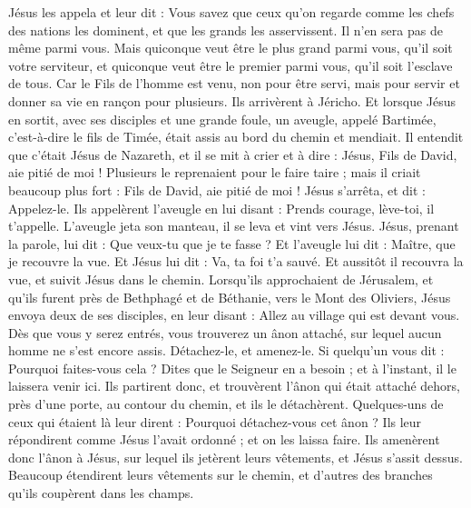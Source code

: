 \begin{multicols}{2}
Jésus les appela et leur dit : Vous savez que ceux qu’on regarde comme les chefs des nations les dominent, et que les grands les asservissent.
Il n'en sera pas de même parmi vous. Mais quiconque veut être le plus grand parmi vous, qu’il soit votre serviteur,
et quiconque veut être le premier parmi vous, qu’il soit l’esclave de tous.
Car le Fils de l'homme est venu, non pour être servi, mais pour servir et donner sa vie en rançon pour plusieurs.
Ils arrivèrent à Jéricho. Et lorsque Jésus en sortit, avec ses disciples et une grande foule, un aveugle, appelé Bartimée, c'est-à-dire le fils de Timée, était assis au bord du chemin et mendiait.
Il entendit que c'était Jésus de Nazareth, et il se mit à crier et à dire : Jésus, Fils de David, aie pitié de moi !
Plusieurs le reprenaient pour le faire taire ; mais il criait beaucoup plus fort : Fils de David, aie pitié de moi !
Jésus s’arrêta, et dit : Appelez-le. Ils appelèrent l’aveugle en lui disant : Prends courage, lève-toi, il t'appelle.
L’aveugle jeta son manteau, il se leva et vint vers Jésus.
Jésus, prenant la parole, lui dit : Que veux-tu que je te fasse ? Et l'aveugle lui dit : Maître, que je recouvre la vue.
Et Jésus lui dit : Va, ta foi t'a sauvé.
Et aussitôt il recouvra la vue, et suivit Jésus dans le chemin.
\VerseOne{}Lorsqu’ils approchaient de Jérusalem, et qu’ils furent près de Bethphagé et de Béthanie, vers le Mont des Oliviers, Jésus envoya deux de ses disciples,
en leur disant : Allez au village qui est devant vous. Dès que vous y serez entrés, vous trouverez un ânon attaché, sur lequel aucun homme ne s’est encore assis. Détachez-le, et amenez-le.
Si quelqu'un vous dit : Pourquoi faites-vous cela ? Dites que le Seigneur en a besoin ; et à l’instant, il le laissera venir ici.
Ils partirent donc, et trouvèrent l'ânon qui était attaché dehors, près d’une porte, au contour du chemin, et ils le détachèrent.
Quelques-uns de ceux qui étaient là leur dirent : Pourquoi détachez-vous cet ânon ?
Ils leur répondirent comme Jésus l’avait ordonné ; et on les laissa faire.
Ils amenèrent donc l'ânon à Jésus, sur lequel ils jetèrent leurs vêtements, et Jésus s’assit dessus.
Beaucoup étendirent leurs vêtements sur le chemin, et d'autres des branches qu’ils coupèrent dans les champs.

\end{multicols}
